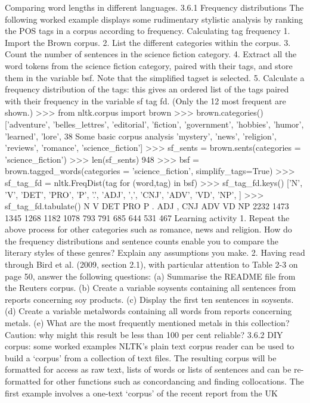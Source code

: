 Comparing word lengths in different languages.
3.6.1 Frequency distributions
The following worked example displays some rudimentary stylistic analysis by
ranking the POS tags in a corpus according to frequency.
Calculating tag frequency
1. Import the Brown corpus.
2. List the different categories within the corpus.
3. Count the number of sentences in the science fiction category.
4. Extract all the word tokens from the science fiction category, paired with their
tags, and store them in the variable bsf. Note that the simplified tagset is
selected.
5. Calculate a frequency distribution of the tags: this gives an ordered list of the
tags paired with their frequency in the variable sf tag fd. (Only the 12 most
frequent are shown.)
>>> from nltk.corpus import brown
>>> brown.categories()
['adventure', 'belles_lettres', 'editorial', 'fiction',
'government', 'hobbies', 'humor', 'learned', 'lore',
38
Some basic corpus analysis
'mystery', 'news', 'religion', 'reviews', 'romance', 'science_fiction']
>>> sf_sents = brown.sents(categories = 'science_fiction')
>>> len(sf_sents)
948
>>> bsf = brown.tagged_words(categories = 'science_fiction',
simplify_tags=True)
>>> sf_tag_fd = nltk.FreqDist(tag for (word,tag) in bsf)
>>> sf_tag_fd.keys()
['N', 'V', 'DET', 'PRO', 'P', '.', 'ADJ', ',', 'CNJ', 'ADV', 'VD', 'NP', ]
>>> sf_tag_fd.tabulate()
N V DET PRO P . ADJ , CNJ ADV VD NP
2232 1473 1345 1268 1182 1078 793 791 685 644 531 467
Learning activity
1. Repeat the above process for other categories such as romance, news and religion. How do the
frequency distributions and sentence counts enable you to compare the literary styles of these
genres? Explain any assumptions you make.
2. Having read through Bird et al. (2009, section 2.1), with particular attention to Table 2-3 on page 50,
answer the following questions:
(a) Summarise the README file from the Reuters corpus.
(b) Create a variable soysents containing all sentences from reports concerning soy products.
(c) Display the first ten sentences in soysents.
(d) Create a variable metalwords containing all words from reports concerning metals.
(e) What are the most frequently mentioned metals in this collection? Caution: why might this result
be less than 100 per cent reliable?
3.6.2 DIY corpus: some worked examples
NLTK’s plain text corpus reader can be used to build a ‘corpus’ from a collection of
text files. The resulting corpus will be formatted for access as raw text, lists of words
or lists of sentences and can be re-formatted for other functions such as
concordancing and finding collocations.
The first example involves a one-text ‘corpus’ of the recent report from the UK
